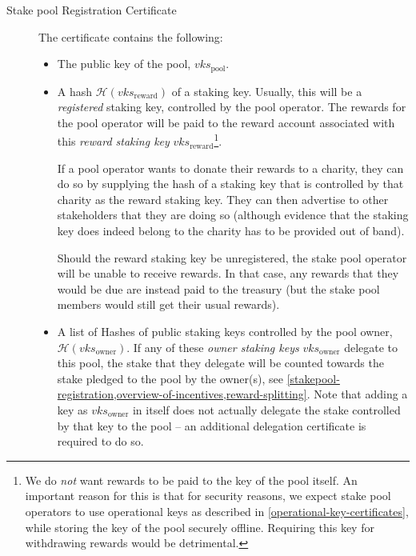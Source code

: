 \documentclass[11pt,a4paper]{article}
\begin{document}
\begin{description}
\item[Stake pool Registration Certificate]
The certificate contains the following:

\begin{itemize}
\item
  The public key of the pool, \(vks_\text{pool}\).

\item
  A hash \(\mathcal{H}(vks_\text{reward})\) of a staking key. Usually, this will
  be a \emph{registered} staking key, controlled by the pool operator. The
  rewards for the pool operator will be paid to the reward account associated
  with this \emph{reward staking key} \(vks_\text{reward}\)\footnote{We do
    \emph{not} want rewards to be paid to the key of the pool itself. An
    important reason for this is that for security reasons, we expect stake pool
    operators to use operational keys as described in
    \cref{operational-key-certificates}, while storing the key of the pool
    securely offline. Requiring this key for withdrawing rewards would be
    detrimental.}.

  If a pool operator wants to donate their rewards to a charity, they can do so
  by supplying the hash of a staking key that is controlled by that charity as
  the reward staking key. They can then advertise to other stakeholders that
  they are doing so (although evidence that the staking key does indeed belong
  to the charity has to be provided out of band).

  Should the reward staking key be unregistered, the stake pool operator will be
  unable to receive rewards. In that case, any rewards that they would be due
  are instead paid to the treasury (but the stake pool members would still get their
  usual rewards).

\item A list of Hashes of public staking keys controlled by the pool owner,
  \(\mathcal{H}(vks_\text{owner})\). If any of these \emph{owner staking keys}
  \(vks_\text{owner}\) delegate to this pool, the stake that they delegate will
  be counted towards the stake pledged to the pool by the owner(s), see
  \cref{stakepool-registration,overview-of-incentives,reward-splitting}. Note
  that adding a key as \(vks_\text{owner}\) in itself does not actually delegate
  the stake controlled by that key to the pool -- an additional delegation
  certificate is required to do so.


\end{itemize}
\end{description}
\end{document}
